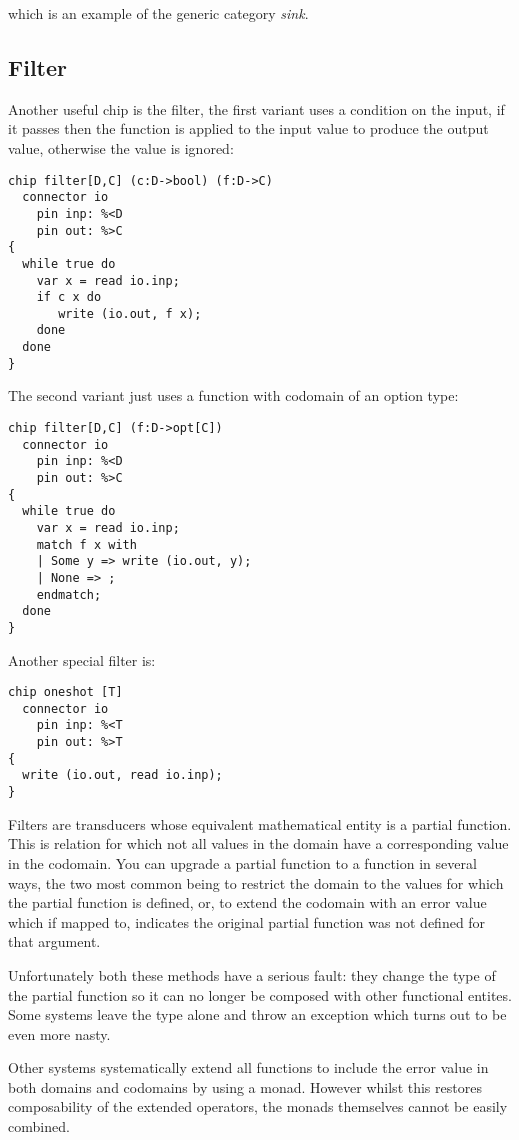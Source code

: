 \documentclass[oneside]{book}
\begin{document}
which is an example of the generic category {\em sink}.

\subsection{Filter}
Another useful chip is the filter, the first variant
uses a condition on the input, if it passes then the
function is applied to the input value to produce
the output value, otherwise the value is ignored:

\begin{verbatim}
chip filter[D,C] (c:D->bool) (f:D->C)
  connector io
    pin inp: %<D
    pin out: %>C
{
  while true do
    var x = read io.inp;
    if c x do
       write (io.out, f x);
    done
  done
}
\end{verbatim}

The second variant just uses a function with codomain
of an option type:

\begin{verbatim}
chip filter[D,C] (f:D->opt[C])
  connector io
    pin inp: %<D
    pin out: %>C
{
  while true do
    var x = read io.inp;
    match f x with
    | Some y => write (io.out, y);
    | None => ;
    endmatch;
  done
}
\end{verbatim}

Another special filter is:

\begin{verbatim}
chip oneshot [T]
  connector io
    pin inp: %<T
    pin out: %>T
{
  write (io.out, read io.inp);
}
\end{verbatim}

Filters are transducers whose equivalent mathematical entity is
a partial function. This is relation for which not all values in
the domain have a corresponding value in the codomain.
You can upgrade a partial function to a function in several ways,
the two most common being to restrict the domain to the values for which
the partial function is defined, or, to extend the codomain with an
error value which if mapped to, indicates the original partial
function was not defined for that argument.

Unfortunately both these methods have a serious fault: they change
the type of the partial function so it can no longer be composed
with other functional entites. Some systems leave the type alone
and throw an exception which turns out to be even more nasty.

Other systems systematically extend all functions to include
the error value in both domains and codomains by using a monad.
However whilst this restores composability of the extended
operators, the monads themselves cannot be easily combined.
\end{document}

